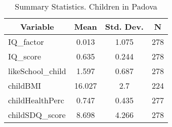 
\begin{table}[htbp]\centering \caption{Summary Statistics. Children in Padova \label{cityChildPadova}}
\begin{tabular}{l c c  c}\hline\hline
\multicolumn{1}{c}{\textbf{Variable}} & \textbf{Mean}
 & \textbf{Std. Dev.} & \textbf{N}\\ \hline
IQ\_factor & 0.013 & 1.075  & 278\\
IQ\_score & 0.635 & 0.244  & 278\\
likeSchool\_child & 1.597 & 0.687  & 278\\
childBMI & 16.027 & 2.7  & 224\\
childHealthPerc & 0.747 & 0.435  & 277\\
childSDQ\_score & 8.698 & 4.266  & 278\\
\hline\end{tabular}
\end{table}
